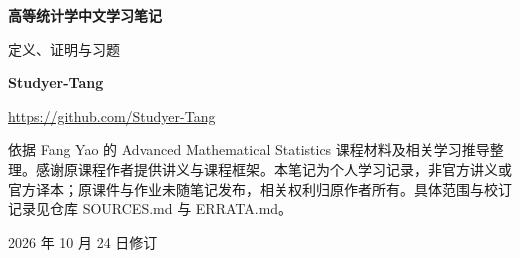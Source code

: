 \begin{titlepage}
  \centering
  \vspace*{30mm}
  {\Huge\bfseries\color{LectureBlue}高等统计学中文学习笔记\par}
  \vspace{8mm}
  {\LARGE \NoteSubtitle\par}
  \vspace{22mm}
  {\large 定义、证明与习题\par}
  \vspace{5mm}
  {\Large\bfseries Studyer-Tang\par}
  \vspace{3mm}
  {\small \url{https://github.com/Studyer-Tang}\par}
  \vfill
  \begin{tcolorbox}[width=.84\textwidth,colback=WarmGray,colframe=LectureBlue!50,arc=1.5mm]
    \small
    依据 Fang Yao 的 Advanced Mathematical Statistics 课程材料及相关学习推导整理。感谢原课程作者提供讲义与课程框架。本笔记为个人学习记录，非官方讲义或官方译本；原课件与作业未随笔记发布，相关权利归原作者所有。具体范围与校订记录见仓库 SOURCES.md 与 ERRATA.md。
  \end{tcolorbox}
  \vspace{10mm}
  {\small 2026 年 10 月 24 日修订\par}
\end{titlepage}
\frontmatter
\hypersetup{pageanchor=true}
\begingroup
\small
\renewcommand{\baselinestretch}{1.0}\selectfont
\tableofcontents
\endgroup
\mainmatter
